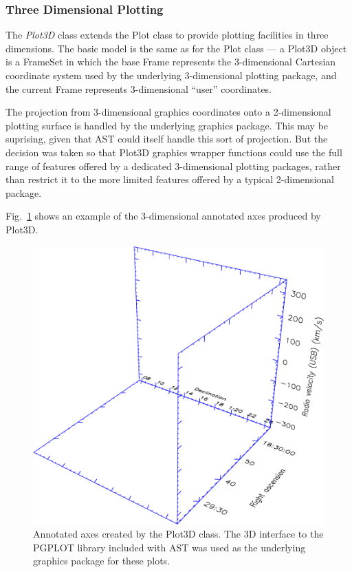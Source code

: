 \documentclass[final,authoryear,5p,times,twocolumn]{elsarticle}
\begin{document}
\subsubsection{Three Dimensional Plotting}

The \emph{Plot3D} class extends the Plot class to provide plotting
facilities in three dimensions. The basic model is the same as for the
Plot class --- a Plot3D object is a FrameSet in which the base Frame
represents the 3-dimensional Cartesian coordinate system used by the
underlying 3-dimensional plotting package, and the current Frame
represents 3-dimensional ``user'' coordinates.

The projection from 3-dimensional graphics coordinates onto a
2-dimensional plotting surface is handled by the underlying graphics
package. This may be suprising, given that AST could itself handle this
sort of projection. But the decision was taken so that Plot3D graphics
wrapper functions could use the full range of features offered by a
dedicated 3-dimensional plotting packages, rather than restrict it to the
more limited features offered by a typical 2-dimensional package.

Fig.~\ref{fig:3dplot} shows an example of the 3-dimensional annotated axes
produced by Plot3D.

\begin{figure}[h]
\centering
\includegraphics[width=\columnwidth]{3dplot}
\caption{Annotated axes created by the Plot3D class. The 3D interface to the
PGPLOT library included with AST was used as the underlying graphics package
for these plots.}
\label{fig:3dplot}
\end{figure}
\end{document}
